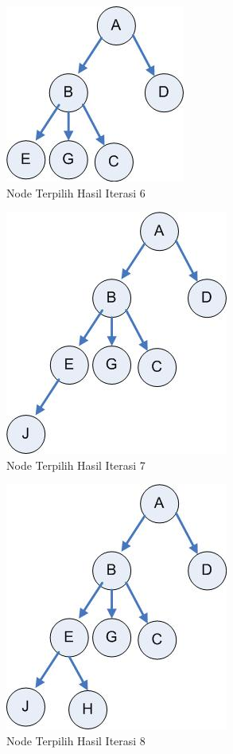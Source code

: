 \begin{enumerate}
\begin{figure}[htbp]
\begin{center}
	\includegraphics[scale=0.5]{fig/sunario-3/ABDEGC.jpg}%
	\caption{Node Terpilih Hasil Iterasi 6}%
\end{center}
\end{figure}

\begin{figure}[htbp]
\begin{center}
	\includegraphics[scale=0.5]{fig/sunario-3/ABDEGCJ.jpg}%
	\caption{Node Terpilih Hasil Iterasi 7}%
\end{center}
\end{figure}

\begin{figure}[htbp]
\begin{center}
	\includegraphics[scale=0.5]{fig/sunario-3/ABDEGCJH.jpg}%
	\caption{Node Terpilih Hasil Iterasi 8}%
\end{center}
\end{figure}



\end{enumerate}
